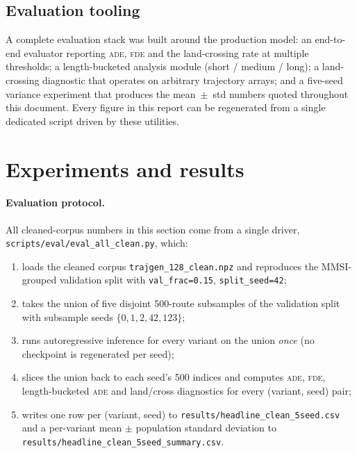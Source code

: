 \documentclass[oneside, a4paper, onecolumn, 11pt]{article}
\newcommand{\ade}{\textsc{ade}}
\newcommand{\fde}{\textsc{fde}}
\begin{document}
\subsection{Evaluation tooling}

A complete evaluation stack was built around the production model: an
end-to-end evaluator reporting \ade{}, \fde{} and the land-crossing
rate at multiple thresholds; a length-bucketed analysis module
(short / medium / long); a land-crossing diagnostic that operates on
arbitrary trajectory arrays; and a five-seed variance experiment that
produces the mean~$\pm$~std numbers quoted throughout this document.
Every figure in this report can be regenerated from a single dedicated
script driven by these utilities.

\section{Experiments and results}\label{sec:experiments}

\paragraph{Evaluation protocol.}
All cleaned-corpus numbers in this section come from a single driver,
\texttt{scripts/eval/eval\_all\_clean.py}, which:

\begin{enumerate}[leftmargin=*]
  \item loads the cleaned corpus \texttt{trajgen\_128\_clean.npz}
        and reproduces the MMSI-grouped validation split with
        \texttt{val\_frac=0.15}, \texttt{split\_seed=42};
  \item takes the union of five disjoint 500-route subsamples of the
        validation split with subsample seeds
        $\{0, 1, 2, 42, 123\}$;
  \item runs autoregressive inference for every variant on the union
        \emph{once} (no checkpoint is regenerated per seed);
  \item slices the union back to each seed's 500 indices and computes
        \ade{}, \fde{}, length-bucketed \ade{} and land/cross
        diagnostics for every (variant, seed) pair;
  \item writes one row per (variant, seed) to
        \texttt{results/headline\_clean\_5seed.csv} and a per-variant
        mean $\pm$ population standard deviation to
        \texttt{results/headline\_clean\_5seed\_summary.csv}.
\end{enumerate}
\end{document}
